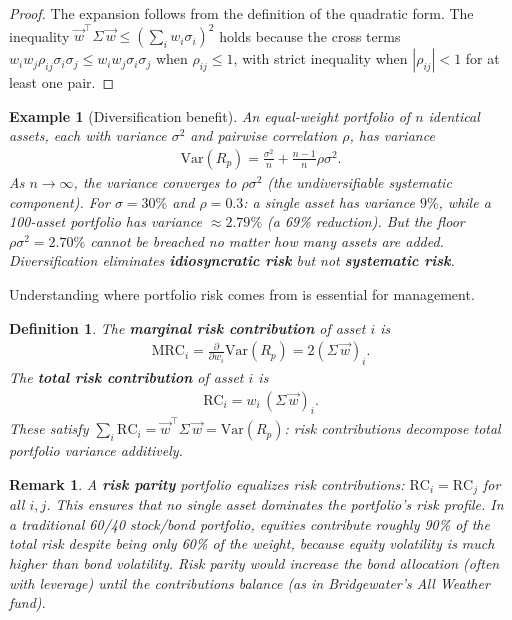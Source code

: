 \documentclass{report}
\theoremstyle{spacedplain}
\theoremstyle{spaceddefinition}
\newtheorem{definition}[theorem]{Definition}
\newtheorem{example}[theorem]{Example}
\theoremstyle{spacedremark}
\newtheorem{remark}[theorem]{Remark}
\begin{document}
\begin{proof}
The expansion follows from the definition of the quadratic form. The inequality $\vec{w}^\top\Sigma\,\vec{w} \leq (\sum_i w_i\sigma_i)^2$ holds because the cross terms $w_iw_j\rho_{ij}\sigma_i\sigma_j \leq w_iw_j\sigma_i\sigma_j$ when $\rho_{ij} \leq 1$, with strict inequality when $|\rho_{ij}| < 1$ for at least one pair.
\end{proof}

\begin{example}[Diversification benefit]
An equal-weight portfolio of $n$ identical assets, each with variance $\sigma^2$ and pairwise correlation $\rho$, has variance
\begin{align}
    \text{Var}(R_p) = \frac{\sigma^2}{n} + \frac{n-1}{n}\rho\sigma^2.
\end{align}
As $n \to \infty$, the variance converges to $\rho\sigma^2$ (the undiversifiable systematic component). For $\sigma = 30\%$ and $\rho = 0.3$: a single asset has variance $9\%$, while a 100-asset portfolio has variance $\approx 2.79\%$ (a 69\% reduction). But the floor $\rho\sigma^2 = 2.70\%$ cannot be breached no matter how many assets are added. Diversification eliminates \textbf{idiosyncratic risk} but not \textbf{systematic risk}.
\end{example}

Understanding where portfolio risk comes from is essential for management.

\begin{definition}
The \textbf{marginal risk contribution} of asset $i$ is
\begin{align}
    \text{MRC}_i = \frac{\partial}{\partial w_i}\text{Var}(R_p) = 2(\Sigma\,\vec{w})_i.
\end{align}
The \textbf{total risk contribution} of asset $i$ is
\begin{align}
    \text{RC}_i = w_i\,(\Sigma\,\vec{w})_i.
\end{align}
These satisfy $\sum_i \text{RC}_i = \vec{w}^\top\Sigma\,\vec{w} = \text{Var}(R_p)$: risk contributions decompose total portfolio variance additively.
\end{definition}

\begin{remark}
A \textbf{risk parity} portfolio equalizes risk contributions: $\text{RC}_i = \text{RC}_j$ for all $i,j$. This ensures that no single asset dominates the portfolio's risk profile. In a traditional 60/40 stock/bond portfolio, equities contribute roughly 90\% of the total risk despite being only 60\% of the weight, because equity volatility is much higher than bond volatility. Risk parity would increase the bond allocation (often with leverage) until the contributions balance (as in Bridgewater's All Weather fund).
\end{remark}
\end{document}
